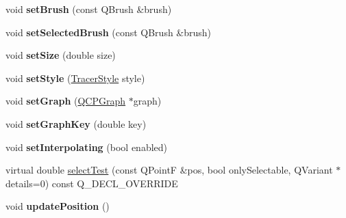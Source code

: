 \begin{DoxyCompactItemize}
\item 
void {\bfseries set\+Brush} (const Q\+Brush \&brush)\hypertarget{class_q_c_p_item_tracer_a2c303f7470a30084daa201ed556b3c36}{}\label{class_q_c_p_item_tracer_a2c303f7470a30084daa201ed556b3c36}

\item 
void {\bfseries set\+Selected\+Brush} (const Q\+Brush \&brush)\hypertarget{class_q_c_p_item_tracer_a0f55c084980a7a312af859d3e7b558ef}{}\label{class_q_c_p_item_tracer_a0f55c084980a7a312af859d3e7b558ef}

\item 
void {\bfseries set\+Size} (double size)\hypertarget{class_q_c_p_item_tracer_ae47fe0617f5fef5fdb766999569be10a}{}\label{class_q_c_p_item_tracer_ae47fe0617f5fef5fdb766999569be10a}

\item 
void {\bfseries set\+Style} (\hyperlink{class_q_c_p_item_tracer_a2f05ddb13978036f902ca3ab47076500}{Tracer\+Style} style)\hypertarget{class_q_c_p_item_tracer_a41a2ac4f1acd7897b4e2a2579c03204e}{}\label{class_q_c_p_item_tracer_a41a2ac4f1acd7897b4e2a2579c03204e}

\item 
void {\bfseries set\+Graph} (\hyperlink{class_q_c_p_graph}{Q\+C\+P\+Graph} $\ast$graph)\hypertarget{class_q_c_p_item_tracer_af5886f4ded8dd68cb4f3388f390790c0}{}\label{class_q_c_p_item_tracer_af5886f4ded8dd68cb4f3388f390790c0}

\item 
void {\bfseries set\+Graph\+Key} (double key)\hypertarget{class_q_c_p_item_tracer_a6840143b42f3b685cedf7c6d83a704c8}{}\label{class_q_c_p_item_tracer_a6840143b42f3b685cedf7c6d83a704c8}

\item 
void {\bfseries set\+Interpolating} (bool enabled)\hypertarget{class_q_c_p_item_tracer_a6c244a9d1175bef12b50afafd4f5fcd2}{}\label{class_q_c_p_item_tracer_a6c244a9d1175bef12b50afafd4f5fcd2}

\item 
virtual double \hyperlink{class_q_c_p_item_tracer_a690bdc69b630e01a16cdd03a883bebbf}{select\+Test} (const Q\+PointF \&pos, bool only\+Selectable, Q\+Variant $\ast$details=0) const Q\+\_\+\+D\+E\+C\+L\+\_\+\+O\+V\+E\+R\+R\+I\+DE
\item 
void {\bfseries update\+Position} ()\hypertarget{class_q_c_p_item_tracer_a5b90296109e36384aedbc8908a670413}{}\label{class_q_c_p_item_tracer_a5b90296109e36384aedbc8908a670413}

\end{DoxyCompactItemize}

